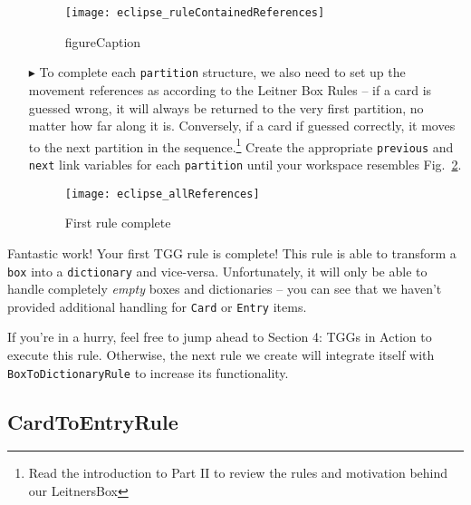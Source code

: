 \begin{itemize}
\begin{figure}[htbp]
\begin{center}
  \texttt{[image: eclipse\_ruleContainedReferences]}
  \caption{figureCaption}
  \label{fig:firstReferences}
\end{center}
\end{figure}

\item[$\blacktriangleright$] To complete each \texttt{partition} structure, we also need to set up the movement references as according to the Leitner Box
Rules -- if a card is guessed wrong, it will always be returned to the very first partition, no matter how far along it is. Conversely, if a card if guessed
correctly, it moves to the next partition in the sequence.\footnote{Read the introduction to Part II to review the rules and motivation behind our LeitnersBox}
Create the appropriate \texttt{previous} and \texttt{next} link variables for each \texttt{partition} until your workspace resembles
Fig.~\ref{fig:allReferences}.

\begin{figure}[htbp]
\begin{center}
  \texttt{[image: eclipse\_allReferences]}
  \caption{First rule complete}
  \label{fig:allReferences}
\end{center}
\end{figure}

\end{itemize}

Fantastic work! Your first TGG rule is complete! This rule is able to transform a \texttt{box} into a \texttt{dictionary} and vice-versa. Unfortunately, it will
only be able to handle completely \emph{empty} boxes and dictionaries -- you can see that we haven't provided additional handling for \texttt{Card} or
\texttt{Entry} items.

If you're in a hurry, feel free to jump ahead to Section 4: TGGs in Action to execute this rule. Otherwise, the next rule we create will integrate itself with
\texttt{BoxToDictionaryRule} to increase its functionality. 

\clearpage

\subsection{CardToEntryRule}

